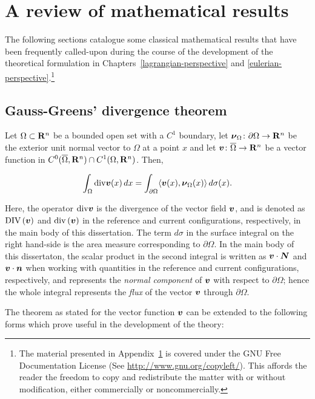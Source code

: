 \chapter{A review of mathematical results}
\label{additional-proofs}

The following sections catalogue some classical mathematical results
that have been frequently called-upon during the course of the
development of the theoretical formulation in
Chapters~\ref{lagrangian-perspective} and
\ref{eulerian-perspective}.\footnote{The material presented in
  Appendix~\ref{additional-proofs} is covered under the GNU Free
  Documentation License (See \href{http://www.gnu.org/copyleft/}
  {http://www.gnu.org/copyleft/}). This affords the reader the freedom
  to copy and redistribute the matter with or without modification,
  either commercially or noncommercially.}

\section{Gauss-Greens' divergence theorem}
\label{gauss-divergence}

Let $\Omega\subset \mathbf R^n$ be a bounded open set with a $C^1$ boundary,
let $\mbox{\boldmath$\nu$}_\Omega\colon \partial \Omega\to \mathbf R^n$ be the exterior unit
normal vector to $\Omega$ at a point $x$ and let $\mbox{\boldmath$ v$}\colon
\overline{\Omega}\to \mathbf R^n$ be a vector function in
$C^0(\overline\Omega,\mathbf R^n)\cap C^1(\Omega,\mathbf R^n)$. Then,

\[
\int_\Omega \mathrm{div} \mbox{\boldmath$ v$}(x)\, dx =\int_{\partial \Omega} \langle
\mbox{\boldmath$ v$}(x),\mbox{\boldmath$\nu$}_\Omega(x)\rangle \, d\sigma(x).
\]

Here, the operator $\mathrm{div} \mbox{\boldmath$ v$}$ is the divergence of the vector
field $\mbox{\boldmath$ v$}$, and is denoted as $\mathrm{DIV} \left(\mbox{\boldmath$ v$}\right)$ and
$\mathrm{div} \left(\mbox{\boldmath$ v$}\right)$ in the reference and current
configurations, respectively, in the main body of this
dissertation. The term $d\sigma$ in the surface integral on the right
hand-side is the area measure corresponding to $\partial \Omega$. In
the main body of this dissertaton, the scalar product in the second
integral is written as $\mbox{\boldmath$ v$} \cdot \mbox{\boldmath$ N$}$ and $\mbox{\boldmath$ v$} \cdot \mbox{\boldmath$ n$}$ when
working with quantities in the reference and current configurations,
respectively, and represents the \emph{normal component} of $\mbox{\boldmath$ v$}$ with
respect to $\partial \Omega$; hence the whole integral represents the
\emph{flux} of the vector $\mbox{\boldmath$ v$}$ through $\partial \Omega$.

The theorem as stated for the vector function $\mbox{\boldmath$ v$}$ can be extended to
the following forms which prove useful in the development of the
theory:

